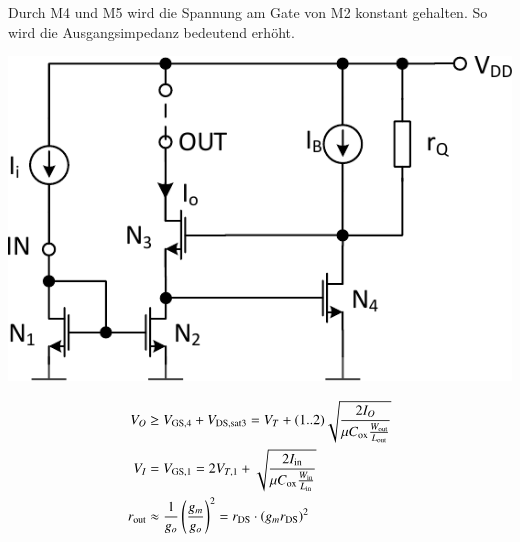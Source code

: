 Durch M4 und M5 wird die Spannung am Gate von M2 konstant gehalten. %
So wird die Ausgangsimpedanz bedeutend erhöht.


\begin{minipage}[t]{0.42\columnwidth}
    \includegraphics[width=\columnwidth, align=t]{images/06_stormspiegel_geregelte_kaskode.pdf}

\end{minipage}
\hfill
\begin{minipage}[t]{0.56\columnwidth}

    \vspace{-0.4cm}

    \begin{align*}
        V_O         &\geq V_{\rm GS,4} + V_{\rm DS,sat3} = V_T + (1..2) \sqrt{ \frac{2 I_O}{\mu C_{\rm ox} \frac{W_{\rm out}}{L_{\rm out}}} }                                                                                           \\
        V_I         &= V_{\rm GS,1} = 2 V_{T,1} + \sqrt{ \frac{2 I_{\rm in}}{\mu C_{\rm ox} \frac{W_{\rm in}}{L_{\rm in}}} }                                                                                                                                     \\
        r_{\rm out} &\approx \frac{1}{g_o} \left( \frac{g_m}{g_o} \right)^2 = r_{\rm DS} \cdot (g_m r_{\rm DS})^2
    \end{align*}
\end{minipage}


